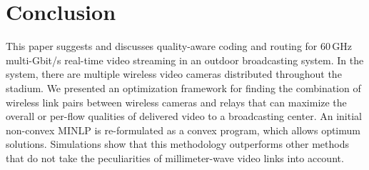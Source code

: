 \documentclass[conference]{IEEEtran}
\begin{document}
\section{Conclusion}\label{sec:conclusions}
This paper suggests and discusses quality-aware coding and routing for 60\,GHz multi-Gbit/s real-time video streaming in an outdoor broadcasting system.
In the system, there are multiple wireless video cameras distributed throughout the stadium.
We presented an optimization framework for finding the combination of wireless link pairs between wireless cameras and relays that can maximize the overall or per-flow qualities of delivered video to a broadcasting center.
An initial non-convex MINLP is re-formulated as a convex program, which allows optimum solutions. Simulations show that this methodology outperforms other methods that do not take the peculiarities of millimeter-wave video links into account.
\end{document}
